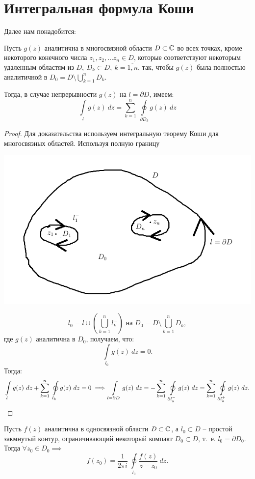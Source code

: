 \documentclass[../../main.tex]{subfiles}
\begin{document}
	\section{Интегральная формула Коши}
	Далее нам понадобится:
	\begin{lemma}
		Пусть $g(z)$ аналитична в многосвязной области $D \subset \mathbb{C}$ во всех 
		точках, кроме некоторого конечного числа $z_1, z_2, \dots z_n \in D$, 
		которые соответствуют некоторым удаленным областям из 
		$D,\ D_k \subset D,\ k = 
		\overline{1,n}$, так, чтобы $g(z)$ была полностью аналитичной в $D_0 = D 
		\setminus \bigcup \limits_{k=1}^{n} D_k$.
		
		Тогда, в случае непрерывности $g(z)$ на $l = \partial D$, имеем:
		\[\int \limits_{l} g(z) \ dz = \sum_{k=1}^{n} \ \oint \limits_{\partial D_k} 
		g(z) \ dz  \]
	\end{lemma}	
	\begin{proof}
	Для доказательства используем интегральную теорему Коши для многосвязных 
	областей. Используя полную границу
	\begin{center}
		\includegraphics[width=0.7\linewidth]{lec32_1}
	\end{center}
	\[ l_0 = l \cup \left(\bigcup \limits_{k=1}^{n} l^{-}_{k}\right) \text{ на } 
	D_0 = D \setminus \bigcup 
	\limits_{k=1}^{n} D_k, \]
	где $g(z)$ аналитична в $D_0$, получаем, что:
	\[ \int \limits_{l_0} g(z) \ dz = 0. \]
	Тогда:
	\[ \int \limits_{l} g(z) \ dz + \sum^{n}_{k=1} \ \oint \limits_{ l_k} g(z) \ 
	dz = 0 \implies \int \limits_{l = \partial D} g(z) \ dz = - \sum_{k=1}^{n} \ 
	\oint \limits_{\partial l_k^{-} } g(z) \ dz = \sum_{k=1}^{n} \ \oint 
	\limits_{\partial l_k^{+} } g(z) \ dz. \qedhere \]
	\end{proof}	
\begin{theorem}
	Пусть $f(z)$ аналитична в односвязной области $D \subset \mathbb{C}$, а $l_0 \subset 
	D$ \--- простой закмнутый контур, ограничивающий некоторый компакт $D_0 
	\subset D$, т.~е. $l_0 = \partial D_0$. Тогда $\forall z_0\in D_0 \implies$
	\begin{equation}
	\label{32:3}
	f(z_0) = \frac{1}{2\pi i} \ \oint \limits_{l_0} \frac{f(z)}{z-z_0} \ dz.
	\end{equation}
\end{theorem}
\end{document}
